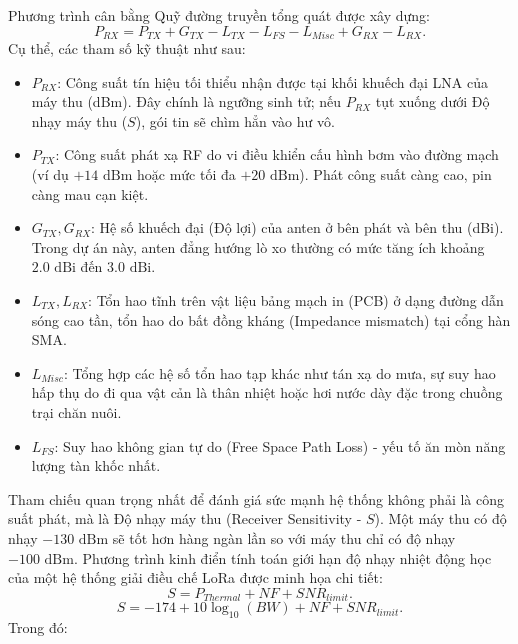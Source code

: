 Phương trình cân bằng Quỹ đường truyền tổng quát được xây dựng:
\begin{equation}
    {P_{RX} = P_{TX} + G_{TX} - L_{TX} - L_{FS} - L_{Misc} + G_{RX} - L_{RX}}.
\end{equation}
Cụ thể, các tham số kỹ thuật như sau:
\begin{itemize}
    \item $P_{RX}$: Công suất tín hiệu tối thiểu nhận được tại khối khuếch đại LNA của máy thu (dBm). Đây chính là ngưỡng sinh tử; nếu $P_{RX}$ tụt xuống dưới Độ nhạy máy thu ($S$), gói tin sẽ chìm hẳn vào hư vô.
    \item $P_{TX}$: Công suất phát xạ RF do vi điều khiển cấu hình bơm vào đường mạch (ví dụ $+14 \text{ dBm}$ hoặc mức tối đa $+20 \text{ dBm}$). Phát công suất càng cao, pin càng mau cạn kiệt.
    \item $G_{TX}, G_{RX}$: Hệ số khuếch đại (Độ lợi) của anten ở bên phát và bên thu (dBi). Trong dự án này, anten đẳng hướng lò xo thường có mức tăng ích khoảng $2.0 \text{ dBi}$ đến $3.0 \text{ dBi}$.
    \item $L_{TX}, L_{RX}$: Tổn hao tĩnh trên vật liệu bảng mạch in (PCB) ở dạng đường dẫn sóng cao tần, tổn hao do bất đồng kháng (Impedance mismatch) tại cổng hàn SMA.
    \item $L_{Misc}$: Tổng hợp các hệ số tổn hao tạp khác như tán xạ do mưa, sự suy hao hấp thụ do đi qua vật cản là thân nhiệt hoặc hơi nước dày đặc trong chuồng trại chăn nuôi.
    \item $L_{FS}$: Suy hao không gian tự do (Free Space Path Loss) - yếu tố ăn mòn năng lượng tàn khốc nhất.
\end{itemize}
Tham chiếu quan trọng nhất để đánh giá sức mạnh hệ thống không phải là công suất phát, mà là Độ nhạy máy thu (Receiver Sensitivity - $S$). Một máy thu có độ nhạy $-130 \text{ dBm}$ sẽ tốt hơn hàng ngàn lần so với máy thu chỉ có độ nhạy $-100 \text{ dBm}$. Phương trình kinh điển tính toán giới hạn độ nhạy nhiệt động học của một hệ thống giải điều chế LoRa được minh họa chi tiết\cite{bor2016do}:
\begin{equation}
    {S = P_{Thermal} + NF + SNR_{limit}}.
\end{equation}
\begin{equation}
    {S = -174 + 10 \log_{10}(BW) + NF + SNR_{limit}}.
\end{equation}
Trong đó: 
